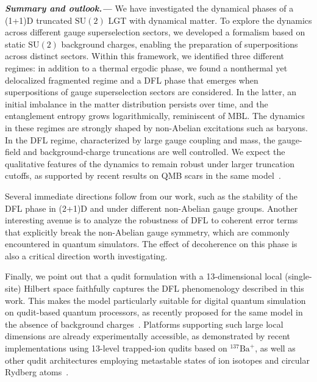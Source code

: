 \documentclass[aps,prl,reprint,twocolumn,superscriptaddress,floatfix,nofootinbib]{revtex4-2}
\begin{document}
\textbf{\textit{Summary and outlook.---}}
We have investigated the dynamical phases of a (1+1)D truncated $\mathrm{SU}(2)$ LGT with dynamical matter.
To explore the dynamics across different gauge superselection sectors, we developed a formalism based on static $\mathrm{SU}(2)$ background charges, enabling the preparation of superpositions across distinct sectors.
Within this framework, we identified three different regimes: in addition to a thermal ergodic phase, we found a nonthermal yet delocalized fragmented regime and a DFL phase that emerges when superpositions of gauge superselection sectors are considered.
In the latter, an initial imbalance in the matter distribution persists over time, and the entanglement entropy grows logarithmically, reminiscent of MBL.
The dynamics in these regimes are strongly shaped by non-Abelian excitations such as baryons.
In the DFL regime, characterized by large gauge coupling and mass, the gauge-field and background-charge truncations are well controlled.
We expect the qualitative features of the dynamics to remain robust under larger truncation cutoffs, as supported by recent results on QMB scars in the same model~\cite{Calajo2025QuantumManybodyScarring}.

Several immediate directions follow from our work, such as the stability of the DFL phase in (2+1)D and under different non-Abelian gauge groups.
Another interesting avenue is to analyze the robustness of DFL to coherent error terms that explicitly break the non-Abelian gauge symmetry, which are commonly encountered in quantum simulators.
The effect of decoherence on this phase is also a critical direction worth investigating.

Finally, we point out that a qudit formulation with a 13-dimensional local (single-site) Hilbert space faithfully captures the DFL phenomenology described in this work.
This makes the model particularly suitable for digital quantum simulation on qudit-based quantum processors, as recently proposed for the same model in the absence of background charges~\cite{Calajo2024DigitalQuantumSimulation}.
Platforms supporting such large local dimensions are already experimentally accessible, as demonstrated by recent implementations using 13-level trapped-ion qudits based on $^{137}\textrm{Ba}^+$\cite{Low2023ControlReadout13level}, as well as other qudit architectures employing metastable states of ion isotopes \cite{Benhelm2008ExperimentalQuantuminformationProcessing} and circular Rydberg atoms~\cite{Kruckenhauser2022HighdimensionalSO4symmetricRydberg, Cohen2021QuantumComputingCircular}.
\end{document}

